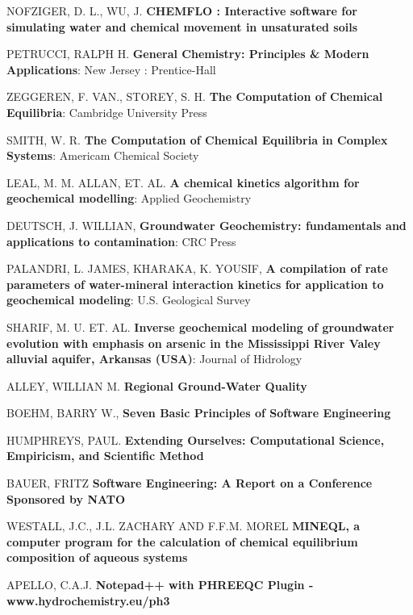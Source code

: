 \documentclass[ppgc,mestrado,english]{iiufrgs}
\begin{document}
\begin{thebibliography}{este-parametro-nao-eh-usado-pelo-estilo-ABNT}
 NOFZIGER, D. L., WU, J.
\textbf{CHEMFLO : Interactive software for simulating water and chemical movement in unsaturated soils}

 PETRUCCI, RALPH H.
\textbf{General Chemistry: Principles \& Modern Applications}: New Jersey : Prentice-Hall

 ZEGGEREN, F. VAN., STOREY, S. H. 
\textbf{The Computation of Chemical Equilibria}: Cambridge University Press

 SMITH, W. R. 
\textbf{The Computation of Chemical Equilibria in Complex Systems}: Americam Chemical Society

 LEAL, M. M. ALLAN, ET. AL.
\textbf{A chemical kinetics algorithm for geochemical modelling}: Applied Geochemistry

 DEUTSCH, J. WILLIAN,
\textbf{Groundwater Geochemistry: fundamentals and applications to contamination}: CRC Press

 PALANDRI, L. JAMES, KHARAKA, K. YOUSIF,
\textbf{A compilation of rate parameters of water-mineral interaction kinetics for application to geochemical modeling}: U.S. Geological Survey

 SHARIF, M. U. ET. AL. 
\textbf{Inverse geochemical modeling of groundwater evolution with emphasis on arsenic in the Mississippi River Valey alluvial aquifer, Arkansas (USA)}: Journal of Hidrology

 ALLEY, WILLIAN M.
\textbf{Regional Ground-Water Quality}

 BOEHM, BARRY W.,
\textbf{Seven Basic Principles of Software Engineering}

 HUMPHREYS, PAUL.
\textbf{Extending Ourselves: Computational Science, Empiricism, and Scientific Method}

 BAUER, FRITZ
\textbf{Software Engineering: A Report on a Conference Sponsored by NATO}

 WESTALL, J.C., J.L. ZACHARY AND F.F.M. MOREL
\textbf{MINEQL, a computer program for the calculation of chemical equilibrium composition of aqueous systems}

 APELLO, C.A.J.
\textbf{Notepad++ with PHREEQC Plugin - www.hydrochemistry.eu/ph3}


\end{thebibliography}
\end{document}
